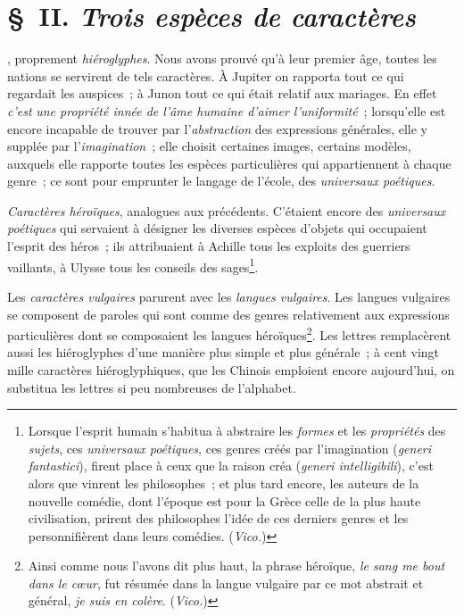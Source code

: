 \documentclass[french,twoside]{book} %
\begin{document}
\section[{§ II. Trois espèces de caractères}]{§ II. {\itshape Trois espèces de caractères}}
, proprement {\itshape hiéroglyphes}. Nous avons prouvé qu’à leur premier âge, toutes les nations se servirent de tels caractères. À Jupiter on rapporta tout ce qui regardait les auspices ; à Junon tout ce qui était relatif aux mariages. En effet {\itshape c’est}  {\itshape une propriété innée de l’âme humaine d’aimer l’uniformité} ; lorsqu’elle est encore incapable de trouver par l’{\itshape abstraction} des expressions générales, elle y supplée par l’{\itshape imagination} ; elle choisit certaines images, certains modèles, auxquels elle rapporte toutes les espèces particulières qui appartiennent à chaque genre ; ce sont pour emprunter le langage de l’école, des {\itshape universaux poétiques}.\par
{\itshape Caractères héroïques}, analogues aux précédents. C’étaient encore des {\itshape universaux poétiques} qui servaient à désigner les diverses espèces d’objets qui occupaient l’esprit des héros ; ils attribuaient à Achille tous les exploits des guerriers vaillants, à Ulysse tous les conseils des sages\footnote{Lorsque l’esprit humain s’habitua à abstraire les {\itshape formes} et les {\itshape propriétés} des {\itshape sujets}, ces {\itshape universaux poétiques}, ces genres créés par l’imagination ({\itshape generi fantastici}), firent place à ceux que la raison créa ({\itshape generi intelligibili}), c’est alors que vinrent les philosophes ; et plus tard encore, les auteurs de la nouvelle comédie, dont l’époque est pour la Grèce celle de la plus haute civilisation, prirent des philosophes l’idée de ces derniers genres et les personnifièrent dans leurs comédies. ({\itshape Vico.})}.\par
Les {\itshape caractères vulgaires} parurent avec les {\itshape langues vulgaires}. Les langues vulgaires se composent de paroles qui sont comme des genres relativement aux expressions particulières dont se composaient les langues héroïques\footnote{Ainsi comme nous l’avons dit plus haut, la phrase héroïque, {\itshape le sang me bout dans le cœur}, fut résumée dans la langue vulgaire par ce mot abstrait et général, {\itshape je suis en colère}. ({\itshape Vico.})}. Les lettres remplacèrent aussi les hiéroglyphes d’une manière plus simple et plus générale ; à cent vingt mille caractères hiéroglyphiques, que les Chinois emploient encore aujourd’hui,  on substitua les lettres si peu nombreuses de l’alphabet.\par
\end{document}
